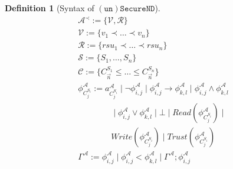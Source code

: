 \documentclass[compsoc, conference, letterpaper, 10pt, times]{IEEEtran}
\newtheorem{definition}{Definition}
\begin{document}
\begin{definition}[Syntax of $\mathtt{(un)SecureND}$]\label{def:syntax} %
	\begin{displaymath}
	\begin{array}{l}
	\mathcal{A}^{\prec}:= \{\mathcal{V, R}\}\\
	\mathcal{V}:= \{v_{1}\prec \ldots \prec v_{n}\}\\
	\mathcal{R}:= \{rsu_{1}\prec\ldots \prec rsu_{n}\}\\
	\mathcal{S}:= \{S_1, \dots, S_{n}\}\\  %
	\mathcal{C}:= \{C^{S_1}_{\overrightarrow{n}}\leq \dots \leq C^{S_{n}}_{\overrightarrow{n}}\}\\  %
	\phi^{\mathcal{A}}_{C^{S_{i}}_{j}}:= a^{\mathcal{A}}_{C^{S_{i}}_{j}}\mid \neg \phi^{\mathcal{A}}_{i,j}\mid \phi^{\mathcal{A}}_{i,j}\rightarrow \phi^{\mathcal{A}}_{k,l}\mid \phi^{\mathcal{A}}_{i,j}\wedge \phi^{\mathcal{A}}_{k,l}\\
	\qquad \qquad \mid \phi^{\mathcal{A}}_{i,j}\vee \phi^{\mathcal{A}}_{k,l} \mid \bot \mid Read(\phi^{\mathcal{A}}_{C^{S_{i}}_{j}})\mid\\ 
	\qquad \qquad Write(\phi^{\mathcal{A}}_{C^{S_{i}}_{j}})\mid Trust(\phi^{\mathcal{A}}_{C^{S_{i}}_{j}})\\
	\Gamma^{\mathcal{A}}:= 
	\phi^{\mathcal{A}}_{i,j} \mid \phi^{\mathcal{A}}_{i,j} < \phi^{\mathcal{A}}_{k,l} \mid \Gamma^{\mathcal{A}}; \phi^{\mathcal{A}}_{i,j}
	
	\end{array}
	\end{displaymath}
\end{definition}
%
\end{document}
